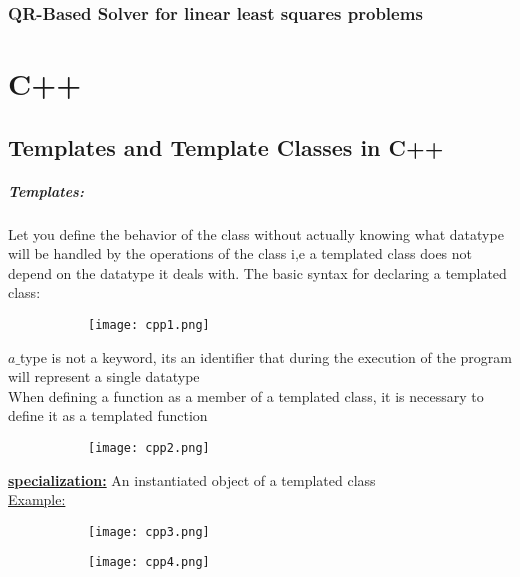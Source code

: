 \documentclass[8pt]{extreport}
\begin{document}
\subsection{QR-Based Solver for linear least squares problems}















\chapter{C++}

\section{Templates and Template Classes in C++} 

\paragraph{Templates:} Let you define the behavior of the class without actually knowing what datatype will be handled by the operations of the class i,e a templated class does not depend on the datatype it deals with. The basic syntax for declaring a templated class:
\begin{figure}[H]
\centering
\begin{subfigure}[b]{0.4\linewidth}
\texttt{[image: cpp1.png]}
\end{subfigure}
\end{figure}
$a\_$type is not a keyword, its an identifier that during the execution of the program will represent a single datatype\\

When defining a function as a member of a templated class, it is necessary to define it as a templated function
\begin{figure}[H]
\centering
\begin{subfigure}[b]{0.4\linewidth}
\texttt{[image: cpp2.png]}
\end{subfigure}
\end{figure}

\underline{\textbf{specialization:}} An instantiated object of a templated class\\
\underline{Example:}
\begin{figure}[H]
\centering
\begin{subfigure}[b]{0.3\linewidth}
\texttt{[image: cpp3.png]}
\end{subfigure}
\begin{subfigure}[b]{0.5\linewidth}
\texttt{[image: cpp4.png]}
\end{subfigure}
\end{figure}
\end{document}

